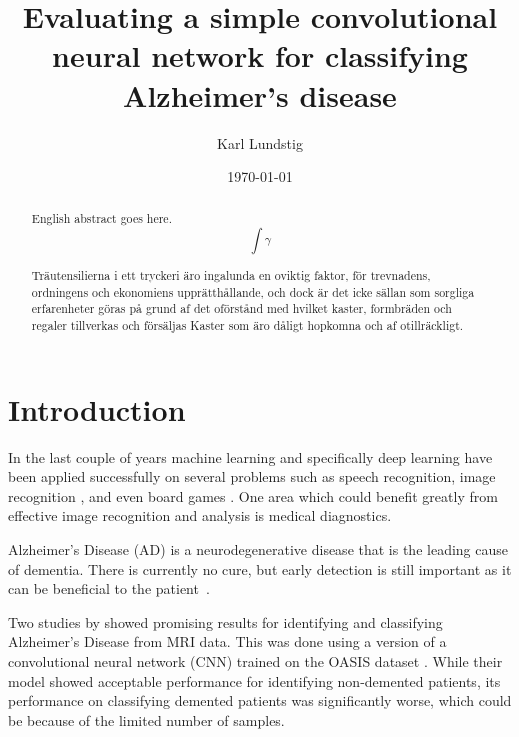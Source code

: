 \documentclass{kththesis}
\title{Evaluating a simple convolutional neural network for classifying Alzheimer's disease}
\author{Karl Lundstig}
\date{\today}
\begin{document}
\frontmatter

\titlepage

\begin{abstract}
  English abstract goes here.
  $$\int \gamma$$

\end{abstract}


\begin{otherlanguage}{swedish}
  \begin{abstract}
    Träutensilierna i ett tryckeri äro ingalunda en oviktig faktor,
    för trevnadens, ordningens och ekonomiens upprätthållande, och
    dock är det icke sällan som sorgliga erfarenheter göras på grund
    af det oförstånd med hvilket kaster, formbräden och regaler
    tillverkas och försäljas Kaster som äro dåligt hopkomna och af
    otillräckligt.
  \end{abstract}
\end{otherlanguage}


\tableofcontents


\mainmatter

\chapter{Introduction}

In the last couple of years machine learning and specifically deep learning have been applied successfully on several problems such as speech recognition, image recognition \parencite{krizhevsky2012imagenet}, and even board games \parencite{silver2018general}. One area which could benefit greatly from effective image recognition and analysis is medical diagnostics.

Alzheimer’s Disease (AD) is a neurodegenerative disease that is the leading cause of dementia. There is currently no cure, but early detection is still important as it can be beneficial to the patient~\cite{factsfigures2018}.

Two studies by \textcite{islam2017novel, islam2018early} showed promising results for identifying and classifying Alzheimer’s Disease from MRI data. This was done using a version of a convolutional neural network (CNN) trained on the OASIS dataset \parencite{marcus2010open}. While their model showed acceptable performance for identifying non-demented patients, its performance on classifying demented patients was significantly worse, which could be because of the limited number of samples. 
\end{document}
